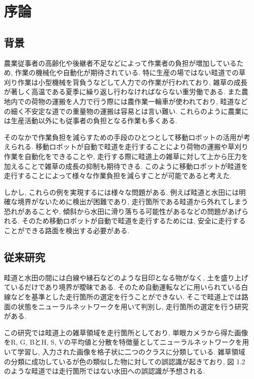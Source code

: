 \chapter{序論}
\section{背景}
農業従事者の高齢化や後継者不足などによって作業者の負担が増加しているため, 作業の機械化や自動化が期待されている. 
特に生産の場ではない畦道での草刈り作業は小型機械を背負うなどして人力での作業が行われており, 雑草の成長が著しく高温である夏季に繰り返し行わなければならない重労働である. 
また農地内での荷物の運搬を人力で行う際には農作業一輪車が使われており, 畦道などの細く不安定な道での重量物の運搬は容易とは言い難い. 
これらのように農業には生産活動以外にも従事者の負担となる作業も多くある.  

そのなかで作業負担を減らすための手段のひとつとして移動ロボットの活用が考えられる. 
移動ロボットが自動で畦道を走行することにより荷物の運搬や草刈り作業を自動化をできることや, 
走行する際に畦道上の雑草に対して上から圧力を加えることで雑草の成長の抑制も期待できる\cite{稲垣栄洋2017踏圧処理が畦畔雑草植生に及ぼす影響}. 
このように移動ロボットが畦道を走行することによって様々な作業負担を減らすことが可能であると考えた. 

しかし, これらの例を実現するには様々な問題がある.  
例えば畦道と水田には明確な境界がないために検出が困難であり, 走行箇所である畦道から外れてしまう恐れがあることや, 
傾斜から水田に滑り落ちる可能性があるなどの問題があげられる. 
そのため移動ロボットが自動で畦道を走行するためには, 安全に走行することができる路面を検出する必要がある.




\section{従来研究}

畦道と水田の間には白線や縁石などのような目印となる物がなく, 土を盛り上げているだけであり境界が曖昧である. 
そのため自動運転などに用いられている白線などを基準とした走行箇所の選定を行うことができない. 
そこで畦道上では路面の状態をニューラルネットワークを用いて判別し, 
走行箇所の選定を行う研究\cite{長橋孝哉2019ニューラルネットワークを用いた畦道の雑草検出に関する研究}がある.  

この研究では畦道上の雑草領域を走行箇所としており, 
単眼カメラから得た画像をR, G, BとH, S, Vの平均値と分散を特徴量としてニューラルネットワークを用いて学習し, 
入力された画像を格子状に二つのクラスに分類している. 
雑草領域の分類に成功しているが色の類似した物に対しての誤認識が起きており, 図 1.2のような畦道では走行箇所ではない水田への誤認識が予想される. 

